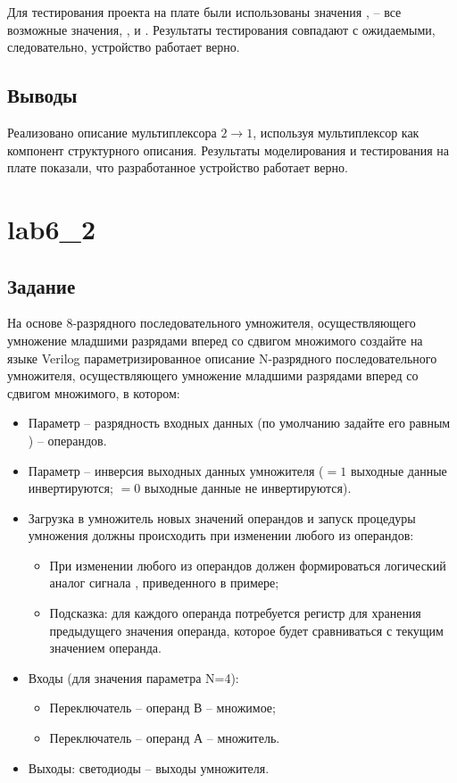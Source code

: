 Для тестирования проекта на плате были использованы значения  ,  -- все возможные значения, ,  и . Результаты тестирования совпадают с ожидаемыми, следовательно, устройство работает верно.

\subsection{Выводы}

Реализовано описание мультиплексора  $2 \rightarrow 1$, используя мультиплексор  как компонент структурного описания. Результаты моделирования и тестирования на плате показали, что разработанное устройство работает верно.

\newpage

\section{lab6\_2}

\subsection{Задание}


На основе 8-разрядного последовательного умножителя, осуществляющего умножение младшими разрядами вперед со сдвигом множимого создайте на языке Verilog параметризированное описание N-разрядного последовательного умножителя, осуществляющего умножение младшими разрядами вперед со сдвигом множимого, в котором:
\begin{itemize}
	\item Параметр  -- разрядность входных данных (по умолчанию задайте его равным ) -- операндов.
	\item Параметр  --  инверсия выходных данных умножителя ($=1$ выходные данные инвертируются; $=0$ выходные данные не инвертируются).
	\item Загрузка в умножитель новых значений операндов и запуск процедуры умножения должны происходить при изменении любого из операндов:
		\begin{itemize}
			\item При изменении любого из операндов должен формироваться логический аналог сигнала , приведенного в примере;
			\item Подсказка: для каждого операнда потребуется регистр для хранения предыдущего значения операнда, которое будет сравниваться с текущим значением операнда.		
		\end{itemize}
	\item Входы (для значения параметра N=4):
		\begin{itemize}
			\item Переключатель  -- операнд В -- множимое;
			\item Переключатель  -- операнд А -- множитель.
		\end{itemize}
	\item Выходы: светодиоды  -- выходы умножителя.
\end{itemize}

